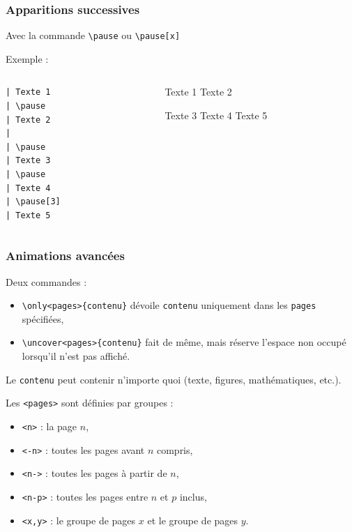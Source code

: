 \begin{frame}[fragile]
  \frametitle{Apparitions successives}

Avec la commande \lstinline?\pause? ou \lstinline?\pause[x]?

\medskip
Exemple :

\begin{columns}
  \begin{column}{0.20\textwidth}
\begin{lstlisting}
| Texte 1
| \pause
| Texte 2
| 
| \pause
| Texte 3
| \pause
| Texte 4
| \pause[3]
| Texte 5
\end{lstlisting}
  \end{column}
  \begin{column}{0.35\textwidth}
\rmfamily
Texte 1
\pause{}
Texte 2

\pause
Texte 3
\pause{}
Texte 4
\pause[3]
Texte 5
  \end{column}
\end{columns}
\end{frame}



\begin{frame}[fragile]
  \frametitle{Animations avancées}

Deux commandes :
\begin{itemize}
  \item \lstinline?\only<pages>{contenu}? dévoile \lstinline?contenu? uniquement dans les \lstinline?pages? spécifiées,
  \item \lstinline?\uncover<pages>{contenu}? fait de même, mais réserve l'espace non occupé lorsqu'il n'est pas affiché.
\end{itemize}

Le \lstinline?contenu? peut contenir n'importe quoi (texte, figures, mathématiques, etc.).

Les \lstinline?<pages>? sont définies par groupes :
\begin{itemize}
  \item \lstinline?<n>? : la page $n$,
  \item \lstinline?<-n>? : toutes les pages avant $n$ compris,
  \item \lstinline?<n->? : toutes les pages à partir de $n$,
  \item \lstinline?<n-p>? : toutes les pages entre $n$ et $p$ inclus,
  \item \lstinline?<x,y>? : le groupe de pages $x$ et le groupe de pages $y$.
\end{itemize}
\end{frame}



